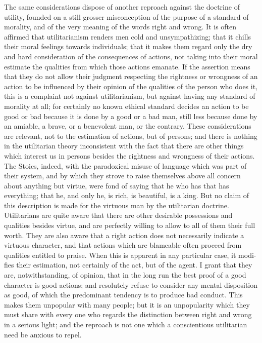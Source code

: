 The same considerations dispose of another reproach against the
doctrine of utility, founded on a still grosser misconception of the
purpose of a standard of morality, and of the very meaning of the
words right and wrong. It is often affirmed that utilitarianism
renders men cold and unsympathizing; that it chills  their
moral feelings towards individuals; that it makes them regard only the
dry and hard consideration of the consequences of actions, not taking
into their moral estimate the qualities from which those actions
emanate. If the assertion means that they do not allow their judgment
respecting the rightness or wrongness of an action to be influenced by
their opinion of the qualities of the person who does it, this is a
complaint not against utilitarianism, but against having any standard
of morality at all; for certainly no known ethical standard decides an
action to be good or bad because it is done by a good or a bad man,
still less because done by an amiable, a brave, or a benevolent man,
or the contrary. These considerations are relevant, not to the
estimation of actions, but of persons; and there is nothing in the
utilitarian theory inconsistent with the fact that there are other
things which interest us in persons besides the rightness and
wrongness of their actions. The Stoics, indeed, with the paradoxical
misuse of language which was part of their system, and by which they
strove to raise themselves above all concern about anything but
virtue, were fond of saying that he who has that has everything; that
he, and only he, is rich, is beautiful, is a king. But no claim of
this description is made for the virtuous man by the utilitarian
doctrine. Utilitarians are quite aware that there are other desirable
possessions and qualities besides virtue, and are perfectly willing to
allow to all of them their full worth. They are also aware that a
right action does not necessarily indicate a virtuous character, and
that actions which are blameable often proceed from qualities entitled
to praise. When this is apparent in any particular case, it
modi-fies their estimation, not certainly of the act, but of
the agent. I grant that they are, notwithstanding, of opinion, that in
the long run the best proof of a good character is good actions; and
resolutely refuse to consider any mental disposition as good, of which
the predominant tendency is to produce bad conduct. This makes them
unpopular with many people; but it is an unpopularity which they must
share with every one who regards the distinction between right and
wrong in a serious light; and the reproach is not one which a
conscientious utilitarian need be anxious to repel.

